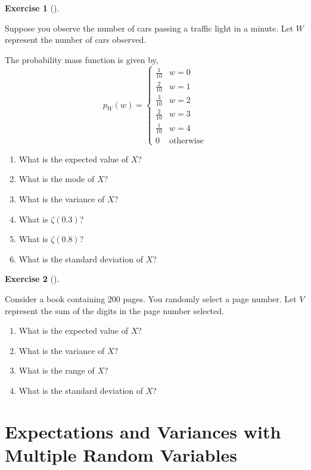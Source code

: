 \documentclass[
  letterpaper,
  DIV=11,
  numbers=noendperiod]{scrreprt}
\providecommand{\tightlist}{%
  \setlength{\itemsep}{0pt}\setlength{\parskip}{0pt}}\usepackage{longtable,booktabs,array}
\theoremstyle{definition}
\newtheorem{exercise}{Exercise}[chapter]
\theoremstyle{definition}
\theoremstyle{definition}
\theoremstyle{remark}
\begin{document}
\begin{exercise}[]\protect\hypertarget{exr-6.14}{}\label{exr-6.14}

Suppose you observe the number of cars passing a traffic light in a
minute. Let \(W\) represent the number of cars observed.

The probability mass function is given by, \[
p_W(w) = \begin{cases} 
\frac{1}{10} & w = 0 \\
\frac{2}{10} & w = 1 \\
\frac{3}{10} & w = 2 \\
\frac{2}{10} & w = 3 \\
\frac{1}{10} & w = 4 \\
0 & \text{otherwise}
\end{cases}
\]

\begin{enumerate}
\def\labelenumi{\alph{enumi}.}
\tightlist
\item
  What is the expected value of \(X\)?
\item
  What is the mode of \(X\)?
\item
  What is the variance of \(X\)?
\item
  What is \(\zeta(0.3)\)?
\item
  What is \(\zeta(0.8)\)?
\item
  What is the standard deviation of \(X\)?
\end{enumerate}

\end{exercise}

\begin{exercise}[]\protect\hypertarget{exr-6.15}{}\label{exr-6.15}

Consider a book containing 200 pages. You randomly select a page number.
Let \(V\) represent the sum of the digits in the page number selected.

\begin{enumerate}
\def\labelenumi{\alph{enumi}.}
\tightlist
\item
  What is the expected value of \(X\)?
\item
  What is the variance of \(X\)?
\item
  What is the range of \(X\)?
\item
  What is the standard deviation of \(X\)?
\end{enumerate}

\end{exercise}

\chapter{Expectations and Variances with Multiple Random
Variables}\label{expectations-and-variances-with-multiple-random-variables}
\end{document}
